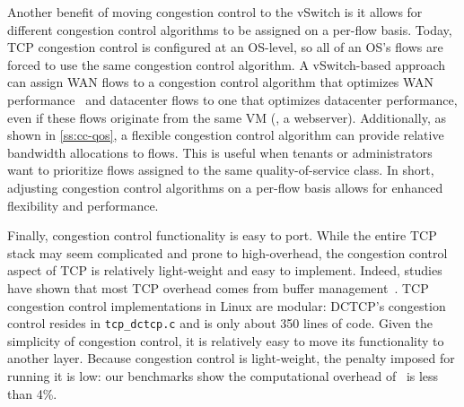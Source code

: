 Another benefit of moving congestion control to the vSwitch is it allows for different congestion control algorithms to be assigned on
a per-flow basis. Today, TCP congestion control is configured at an OS-level, so all of an OS's flows are forced to use the same congestion control algorithm.
A vSwitch-based approach can assign WAN flows to a congestion control algorithm that optimizes WAN performance~\cite{tan2006compound,flach2013reducing} and
datacenter flows to one that optimizes datacenter performance, even if these flows originate from the same VM (\eg{}, a webserver).
Additionally, as shown in \cref{ss:cc-qos}, a flexible congestion control algorithm can provide relative bandwidth allocations to flows.
This is useful when tenants or administrators want to prioritize flows assigned to the same quality-of-service class.
In short, adjusting congestion control algorithms on a per-flow basis allows for 
enhanced flexibility and performance.

Finally, congestion control functionality is easy to port. While the entire TCP stack may seem complicated and prone to high-overhead,
the congestion control aspect of TCP is relatively light-weight and easy to implement. Indeed, studies have
shown that most TCP overhead comes from buffer management~\cite{optimize-tcp-receive}. TCP congestion control implementations in Linux
are modular: DCTCP's congestion control resides in {\tt tcp\_dctcp.c} and is only about 350 lines of code. Given
the simplicity of congestion control, it is relatively easy to move its functionality to another
layer. Because congestion
control is light-weight, the penalty imposed for running it is low: our benchmarks show the computational overhead of~\acdc{} is less than 4\%.


